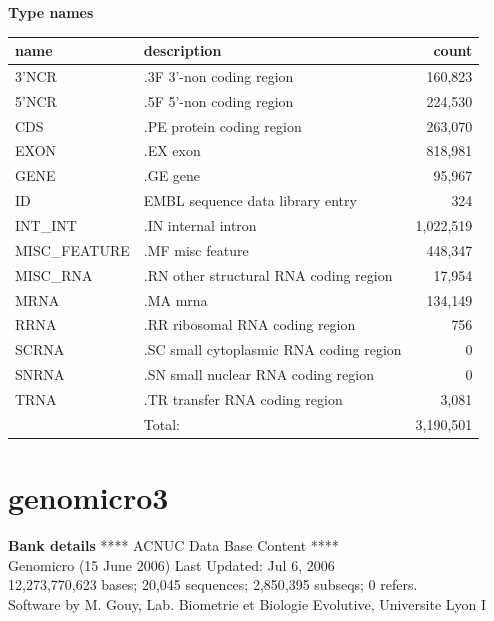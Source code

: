 \documentclass{article}
\begin{document}
\begin{Schunk}
\textbf{Type names}
\noindent\begin{tabular}{llr}
\hline \hline
name & description & count \\
\hline
3'NCR  &  .3F  3'-non coding region  &  160,823 \\
5'NCR  &  .5F  5'-non coding region  &  224,530 \\
CDS  &  .PE protein coding region  &  263,070 \\
EXON  &  .EX exon  &  818,981 \\
GENE  &  .GE gene  &  95,967 \\
ID  &  EMBL sequence data library entry  &  324 \\
INT\_INT  &  .IN  internal intron  &  1,022,519 \\
MISC\_FEATURE  &  .MF misc feature  &  448,347 \\
MISC\_RNA  &  .RN other structural RNA coding region  &  17,954 \\
MRNA  &  .MA mrna  &  134,149 \\
RRNA  &  .RR ribosomal RNA coding region  &  756 \\
SCRNA  &  .SC small cytoplasmic RNA coding region  &  0 \\
SNRNA  &  .SN small nuclear RNA coding region  &  0 \\
TRNA  &  .TR transfer RNA coding region  &  3,081 \\
\hline
 & Total: & 3,190,501 \\
\hline \hline
\end{tabular}

\section{ genomicro3 }
\textbf{Bank details}
             ****     ACNUC Data Base Content      ****                         \\
              Genomicro (15 June 2006) Last Updated: Jul  6, 2006\\
12,273,770,623 bases; 20,045 sequences; 2,850,395 subseqs; 0 refers.\\
Software by M. Gouy, Lab. Biometrie et Biologie Evolutive, Universite Lyon I 


\end{Schunk}
\end{document}
